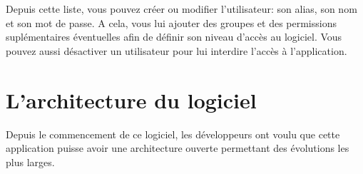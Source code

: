 \documentclass[a4paper,10pt,oneside,french]{sphinxmanual}
\begin{document}
\noindent{}

Depuis cette liste, vous pouvez créer ou modifier l’utilisateur: son
alias, son nom et son mot de passe. A cela, vous lui ajouter des groupes et
des permissions suplémentaires éventuelles afin de définir son niveau
d’accès au logiciel. Vous pouvez aussi désactiver un utilisateur pour lui
interdire l’accès à l’application.

\noindent{}

\noindent{}


\section{L’architecture du logiciel}
\label{\detokenize{CORE/architecture:l-architecture-du-logiciel}}\label{\detokenize{CORE/architecture::doc}}
Depuis le commencement de ce logiciel, les développeurs ont voulu que cette application puisse avoir une architecture ouverte permettant des évolutions les plus larges.



\renewcommand{\indexname}{Index}
\printindex
\end{document}

